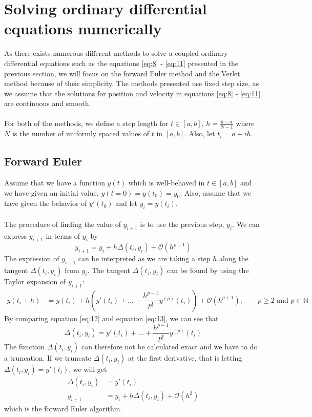 \documentclass[12pt]{article}
\begin{document}
	\section{Solving ordinary differential equations numerically}
	As there exists numerous different methods to solve a coupled ordinary differential equations such as the equations \ref{eq:8} - \ref{eq:11} presented in the previous section, we will focus on the forward Euler method and the Verlet method because of their simplicity. The methods presented use fixed step size, as we assume that the solutions for position and velocity in equations \ref{eq:8} - \ref{eq:11} are continuous and smooth.\\ \\
	For both of the methods, we define a step length for $t\in[a,b]$, $h = \frac{b-a}{N-1}$ where $N$ is the number of uniformly spaced values of $t$ in $[a,b]$. Also, let $t_i = a + ih$. 
	\subsection{Forward Euler}\label{sec:3.1}
	Assume that we have a function $y(t)$ which is well-behaved in $t\in[a,b]$ and we have given an initial value, $y(t=0) = y(t_0) = y_0$. Also, assume that we have given the behavior of $y'(t_0)$ and let $y_i = y(t_i)$.  
	\\ \\
	The procedure of finding the value of $y_{i+1}$ is to use the previous step, $y_i$. We can express  $y_{i+1}$  in terms of $y_i$ by 
	\begin{equation}\label{eq:12}
		y_{i+1} = y_i + h\Delta(t_i,y_i) + \mathcal{O}(h^{p+1})
	\end{equation} 
	 The expression of $y_{i+1}$ can be interpreted as we are taking a step $h$ along the tangent $\Delta(t_i,y_i)$ from $y_i$.   The tangent $\Delta(t_i,y_i)$ can be found by using the Taylor expansion of $y_{i+1}$: 
	 \begin{equation}\label{eq:13}
	 \begin{aligned}
	 y(t_i + h) &= y(t_i) + h\left(y'(t_i) + \dots + \dfrac{h^{p-1}}{p!}y^{(p)}(t_i)\right) + \mathcal{O}(h^{p+1}), \qquad p\geq 2 \text{ and } p\in \mathbb{N}
	 \end{aligned}
	 \end{equation}
	 By  comparing equation \ref{eq:12} and equation \ref{eq:13}, we can see that 
	 \begin{equation*}
	 	\Delta(t_i,y_i) = y'(t_i) + \dots + \dfrac{h^{p-1}}{p!}y^{(p)}(t_i)
	 \end{equation*}
	 The function $\Delta(t_i,y_i)$ can therefore not be calculated exact and we have to do a truncation. If we truncate $\Delta(t_i,y_i)$ at the first derivative, that is letting $\Delta(t_i,y_i) = y'(t_i)$, we will get 
	 \begin{equation}\label{eq:euler}
	\begin{aligned}
	\Delta(t_i,y_i)  &= y'(t_i)\\
	y_{i+1} &= y_i + h\Delta(t_i,y_i) + \mathcal{O}(h^2)
	\end{aligned}
	 \end{equation}
	 which is the forward Euler algorithm. 
\end{document}
